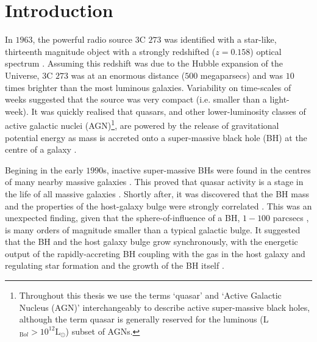 
\chapter{Introduction}
\label{ch:intro}

In $1963$, the powerful radio source $3$C $273$ was identified with a star-like, thirteenth magnitude object with a strongly redshifted ($z=0.158$)  optical spectrum \citep{schmidt63}. 
Assuming this redshift was due to the Hubble expansion of the Universe, $3$C $273$ was at an enormous distance ($500$ megaparsecs) and was $10$ times brighter than the most luminous galaxies. 
Variability on time-scales of weeks suggested that the source was very compact (i.e. smaller than a light-week).
It was quickly realised that quasars, and other lower-luminosity classes of active galactic nuclei (AGN)\footnote{Throughout this thesis we use the terms `quasar' and `Active Galactic Nucleus (AGN)' interchangeably to describe active super-massive black holes, although the term quasar is generally reserved for the luminous (L$_{\mathrm Bol} > 10^{12}{\mathrm L}_{\odot}$) subset of AGNs.}, are powered by the release of gravitational potential energy as mass is accreted onto a super-massive  black hole (BH) at the centre of a galaxy \citep[e.g.][]{hoyle63,salpeter64,lynden-bell69,lynden-bell71}. 

Begining in the early $1990$s, inactive super-massive BHs were found in the centres of many nearby massive galaxies \citep[e.g.][]{kormendy95,ferrarese05,kormendy13}.
This proved that quasar activity is a stage in the life of all massive galaxies \citep[e.g.][]{lynden-bell69}. 
Shortly after, it was discovered that the BH mass and the properties of the host-galaxy bulge were strongly correlated \citep[e.g. the M$_{\mathrm BH}$-$\sigma$ relation][]{ferrarese00,gebhardt00,graham01,tremaine02,marconi03,aller07,gultekin09}. 
This was an unexpected finding, given that the sphere-of-influence  of a BH, $1-100$ parcsecs \citep{kormendy13}, is many orders of magnitude smaller than a typical galactic bulge. 
It suggested that the BH and the host galaxy bulge grow synchronously, with the energetic output of the rapidly-accreting BH coupling with the gas in the host galaxy and regulating star formation and the growth of the BH itself \citep[e.g.][]{silk98,king03,dimatteo05,king15}. 

